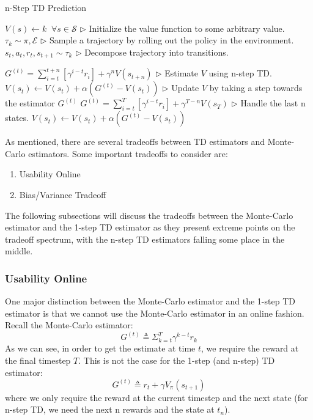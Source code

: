 \documentclass[11pt]{article}
\begin{document}
\begin{algorithm}[H]
\caption{n-Step TD Prediction}
\label{algo:nstep_td}
\begin{algorithmic}[1]
\STATE $V(s) \leftarrow k \;\; \forall s \in \mathcal{S}$ \hfill $\triangleright$ Initialize the value function to some arbitrary value.
    \STATE $\tau_k \sim \pi, \mathcal{E}$ \hfill $\triangleright$ Sample a trajectory by rolling out the policy in the environment.
    \STATE ${s_t, a_t, r_t, s_{t+1}} \sim \tau_k$ \hfill $\triangleright$ Decompose trajectory into transitions.
    
        \STATE $G^{(t)} = \sum_{i=t}^{t+n} [\gamma^{i-t} r_{i}] + \gamma^n V(s_{t+n})$ \hfill $\triangleright$ Estimate $V$ using n-step TD.
        \STATE $V(s_t) \leftarrow V(s_t) + \alpha (G^{(t)} - V(s_t))$ \hfill $\triangleright$ Update $V$ by taking a step towards the estimator $G^{(t)}$
    \ENDFOR
        \STATE $G^{(t)} = \sum_{i=t}^{T} [\gamma^{i-t} r_{i}] + \gamma^{T-n} V(s_{T})$ \hfill $\triangleright$ Handle the last n states.
        \STATE $V(s_t) \leftarrow V(s_t) + \alpha (G^{(t)} - V(s_t))$
    \ENDFOR
\ENDFOR
\end{algorithmic}
\end{algorithm}
As mentioned, there are several tradeoffs between TD estimators and Monte-Carlo estimators. Some important tradeoffs to consider are:
\begin{enumerate}
    \item Usability Online
    \item Bias/Variance Tradeoff
\end{enumerate}
The following subsections will discuss the tradeoffs between the Monte-Carlo estimator and the 1-step TD estimator as they present extreme points on the tradeoff spectrum, with the n-step TD estimators falling some place in the middle.

\subsubsection{Usability Online}
One major distinction between the Monte-Carlo estimator and the 1-step TD estimator is that we cannot use the Monte-Carlo estimator in an online fashion. Recall the Monte-Carlo estimator:
\begin{equation*}
    G^{(t)} \triangleq \Sigma_{k=t}^{T} \gamma^{k-t} r_k
\end{equation*}
As we can see, in order to get the estimate at time $t$, we require the reward at the final timestep $T$. This is not the case for the 1-step (and n-step) TD estimator:
\begin{equation*}
    G^{(t)} \triangleq r_t + \gamma V_\pi(s_{t+1})
\end{equation*}
where we only require the reward at the current timestep and the next state (for n-step TD, we need the next n rewards and the state at $t_n$). 
\end{document}
